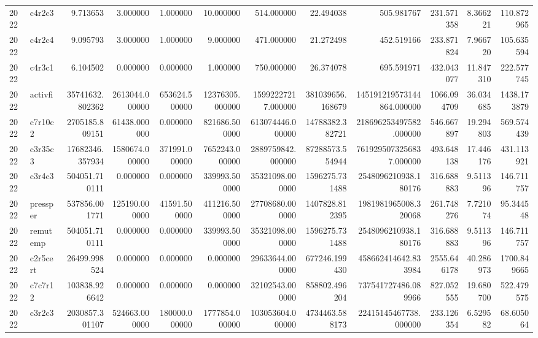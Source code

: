 \begin{tabular}{llrrrrrrrrrr}
2022 & c4r2c3 & 9.713653 & 3.000000 & 1.000000 & 10.000000 & 514.000000 & 22.494038 & 505.981767 & 231.571358 & 8.366221 & 110.872965 \\
2022 & c4r2c4 & 9.095793 & 3.000000 & 1.000000 & 9.000000 & 471.000000 & 21.272498 & 452.519166 & 233.871824 & 7.966720 & 105.635594 \\
2022 & c4r3c1 & 6.104502 & 0.000000 & 0.000000 & 1.000000 & 750.000000 & 26.374078 & 695.591971 & 432.043077 & 11.847310 & 222.577745 \\
2022 & activfi & 35741632.802362 & 2613044.000000 & 653624.500000 & 12376305.000000 & 15992227217.000000 & 381039656.168679 & 145191219573144864.000000 & 1066.094709 & 36.034685 & 1438.173879 \\
2022 & c7r10c2 & 2705185.809151 & 61438.000000 & 0.000000 & 821686.500000 & 613074446.000000 & 14788382.382721 & 218696253497582.000000 & 546.667897 & 19.294803 & 569.574439 \\
2022 & c3r35c3 & 17682346.357934 & 1580674.000000 & 371991.000000 & 7652243.000000 & 2889759842.000000 & 87288573.554944 & 7619295073256837.000000 & 493.648138 & 17.446176 & 431.113921 \\
2022 & c3r4c3 & 504051.710111 & 0.000000 & 0.000000 & 339993.500000 & 35321098.000000 & 1596275.731488 & 2548096210938.180176 & 316.688883 & 9.511396 & 146.711757 \\
2022 & pressper & 537856.001771 & 125190.000000 & 41591.500000 & 411216.500000 & 27708680.000000 & 1407828.812395 & 1981981965008.320068 & 261.748276 & 7.721074 & 95.344548 \\
2022 & remutemp & 504051.710111 & 0.000000 & 0.000000 & 339993.500000 & 35321098.000000 & 1596275.731488 & 2548096210938.180176 & 316.688883 & 9.511396 & 146.711757 \\
2022 & c2r5cert & 26499.998524 & 0.000000 & 0.000000 & 0.000000 & 29633644.000000 & 677246.199430 & 458662414642.833984 & 2555.646178 & 40.286973 & 1700.849665 \\
2022 & c7c7r12 & 103838.926642 & 0.000000 & 0.000000 & 0.000000 & 32102543.000000 & 858802.496204 & 737541727486.089966 & 827.052555 & 19.680700 & 522.479575 \\
2022 & c3r2c3 & 2030857.301107 & 524663.000000 & 180000.000000 & 1777854.000000 & 103053604.000000 & 4734463.588173 & 22415145467738.000000 & 233.126354 & 6.529582 & 68.605064 \\
\bottomrule
\end{tabular}
